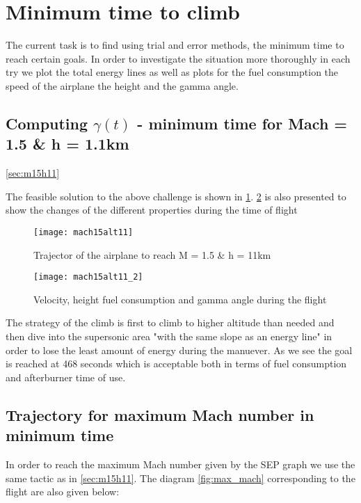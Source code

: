 \section{Minimum time to climb}

\noindent The current task is to find using trial and error methods, the minimum time 
to reach certain goals. In order to investigate the situation more thoroughly 
in each try we plot the total energy lines as well as plots for the fuel consumption
the speed of the airplane the height and the gamma angle.

\subsection{Computing $\gamma(t)$  - minimum time for Mach = 1.5 \& h = 1.1km}
\ref{sec:m15h11}

The feasible solution to the above challenge is shown in \ref{fig:m15h11}. \ref{fig:m15h11_2}
is also presented to show the changes of the different properties during the time of flight

\begin{figure}[H]
    \centering
    \hspace*{-2cm}
    \texttt{[image: mach15alt11]}
    \caption{Trajector of the airplane to reach M = 1.5 \& h = 11km}
    \label{fig:m15h11}
\end{figure}

\begin{figure}[H]
    \centering
    \hspace*{-2cm}
    \texttt{[image: mach15alt11\_2]}
    \caption{Velocity, height fuel consumption and gamma angle during the flight}
    \label{fig:m15h11_2}
\end{figure}

The strategy of the climb is first to climb to higher altitude than needed and then
dive into the supersonic area "with the same slope as an energy line" in order to
lose the least amount of energy during the manuever.
As we see the goal is reached at 468 seconds which is  acceptable both in terms of 
fuel consumption and afterburner time of use.


\subsection{Trajectory for maximum Mach number in minimum time}
In order to reach the maximum Mach number given by the SEP graph we use the same
tactic as in \ref{sec:m15h11}. The diagram \ref{fig:max_mach} corresponding to the flight are also given below:

